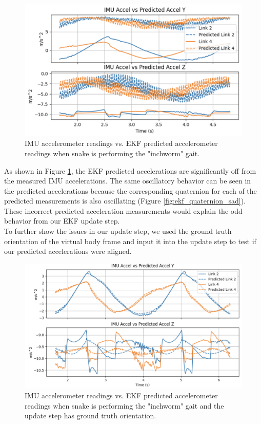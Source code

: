 \documentclass[letterpaper, 10 pt, conference]{ieeeconf}  %
\begin{document}
\begin{figure}[H]
    \centering
    \includegraphics[width = 0.75\linewidth]{ekf_bad_accels.png}
    \caption{IMU accelerometer readings vs. EKF predicted accelerometer readings when snake is performing the "inchworm" gait.}
    \label{fig:ekf_bad_accels}
\end{figure}

As shown in Figure \ref{fig:ekf_bad_accels}, the EKF predicted accelerations are significantly off from the measured IMU accelerations. The same oscillatory behavior can be seen in the predicted accelerations because the corresponding quaternion for each of the predicted measurements is also oscillating (Figure \ref{fig:ekf_quaternion_sad}). These incorrect predicted acceleration measurements would explain the odd behavior from our EKF update step.\\

To further show the issues in our update step, we used the ground truth orientation of the virtual body frame and input it into the update step to test if our predicted accelerations were aligned.

\begin{figure}[H]
    \centering
    \includegraphics[width = 0.75\linewidth]{ekf_accels_w_gt.png}
    \caption{IMU accelerometer readings vs. EKF predicted accelerometer readings when snake is performing the "inchworm" gait and the update step has ground truth orientation.}
    \label{fig:ekf_accels_w_gt}
\end{figure}
\end{document}
